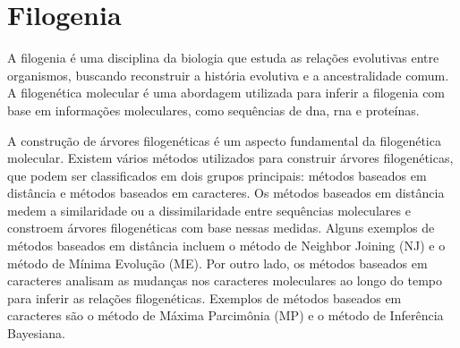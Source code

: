 \section{Filogenia}

A filogenia é uma disciplina da biologia que estuda as relações evolutivas entre organismos, buscando reconstruir a história evolutiva e a ancestralidade comum. A filogenética molecular é uma abordagem utilizada para inferir a filogenia com base em informações moleculares, como sequências de \gls{dna}, \gls{rna} e proteínas\cite{felsenstein_inferring_2004}.

A construção de árvores filogenéticas é um aspecto fundamental da filogenética molecular. Existem vários métodos utilizados para construir árvores filogenéticas, que podem ser classificados em dois grupos principais: métodos baseados em distância e métodos baseados em caracteres.
Os métodos baseados em distância medem a similaridade ou a dissimilaridade entre sequências moleculares e constroem árvores filogenéticas com base nessas medidas. Alguns exemplos de métodos baseados em distância incluem o método de Neighbor Joining (NJ) e o método de Mínima Evolução (ME).
Por outro lado, os métodos baseados em caracteres analisam as mudanças nos caracteres moleculares ao longo do tempo para inferir as relações filogenéticas. Exemplos de métodos baseados em caracteres são o método de Máxima Parcimônia (MP) e o método de Inferência Bayesiana\cite{swofford_phylogenetic_1996}.







